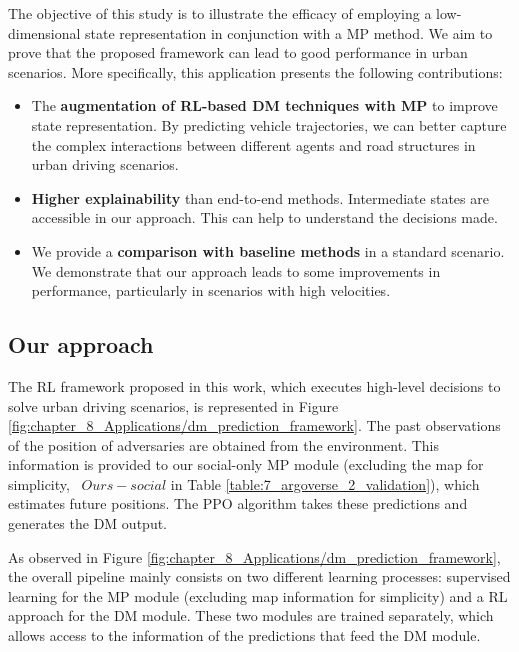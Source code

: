 The objective of this study is to illustrate the efficacy of employing a low-dimensional state representation in conjunction with a \ac{MP} method. We aim to prove that the proposed framework can lead to good performance in urban scenarios. More specifically, this application presents the following contributions:

\begin{itemize}
	\item The \textbf{augmentation of \ac{RL}-based \ac{DM} techniques with \ac{MP}} to improve state representation. By predicting vehicle trajectories, we can better capture the complex interactions between different agents and road structures in urban driving scenarios. 
	
	\item \textbf{Higher explainability} than end-to-end methods. Intermediate states are accessible in our approach. This can help to understand the decisions made.
	
	\item We provide a \textbf{comparison with baseline methods} in a standard scenario. We demonstrate that our approach leads to some improvements in performance, particularly in scenarios with high velocities.
\end{itemize}

\subsection{Our approach}
\label{subsec:8_decision_making_our_approach}

The \ac{RL} framework proposed in this work, which executes high-level decisions to solve urban driving scenarios, is represented in Figure \ref{fig:chapter_8_Applications/dm_prediction_framework}. The past observations of the position of adversaries are obtained from the environment. This information is provided to our social-only \ac{MP} module (excluding the map for simplicity, \ie \ $Ours-social$ in Table \ref{table:7_argoverse_2_validation}), which estimates future positions. The \ac{PPO} algorithm takes these predictions and generates the \ac{DM} output.

As observed in Figure \ref{fig:chapter_8_Applications/dm_prediction_framework}, the overall pipeline mainly consists on two different learning processes: supervised learning for the \ac{MP} module (excluding map information for simplicity) and a \ac{RL} approach for the \ac{DM} module. These two modules are trained separately, which allows access to the information of the predictions that feed the \ac{DM} module. 

